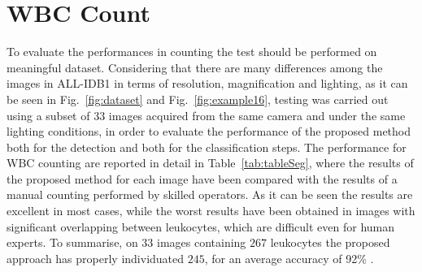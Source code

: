 \documentclass[final,a4paper,12pt,english]{UnicaPhdThesis3}
\begin{document}
	\section{WBC Count}
	To evaluate the performances in counting the test should be performed on meaningful dataset. Considering that there are many differences among the images in ALL-IDB1 in terms of resolution, magnification and lighting, as it can be seen in Fig.~\ref{fig:dataset} and Fig.~\ref{fig:example16}, testing was carried out using a subset of $33$ images acquired from the same camera and under the same lighting conditions, in order to evaluate the performance of the proposed method  both for the detection and both for the classification steps. The  performance for WBC counting are reported in detail in Table~\ref{tab:tableSeg}, where the results of the proposed method for each image have been compared with the results of a manual counting performed by skilled operators. As it can be seen the results are excellent in most cases, while the worst results have been obtained in images with significant overlapping between leukocytes, which are difficult even for human experts. To summarise, on $33$ images containing $267$ leukocytes the proposed approach has properly individuated $245$, for an  average  accuracy  of 92\% . 
	
\end{document}
